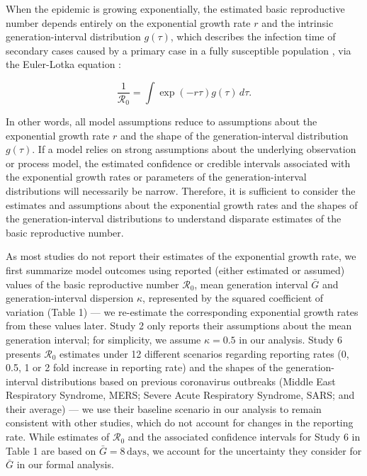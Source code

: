 \documentclass[12pt]{article}
\newcommand{\Ro}{\ensuremath{{\mathcal R}_{0}}\xspace}
\begin{document}
When the epidemic is growing exponentially, the estimated basic reproductive number depends entirely on the exponential growth rate $r$ and the intrinsic generation-interval distribution $g(\tau)$, which describes the infection time of secondary cases caused by a primary case in a fully susceptible population \citep{champredon2015intrinsic}, via the Euler-Lotka equation \citep{wallinga2007generation}:
\begin{linenomath*}
\begin{equation}
\frac{1}{\Ro} = \int \exp(-r\tau) g(\tau) \, d\tau.
\label{eq:euler}
\end{equation}
\end{linenomath*}
In other words, all model assumptions reduce to assumptions about the exponential growth rate $r$ and the shape of the generation-interval distribution $g(\tau)$.
If a model relies on strong assumptions about the underlying observation or process model, the estimated confidence or credible intervals associated with the exponential growth rates or parameters of the generation-interval distributions will necessarily be narrow.
Therefore, it is sufficient to consider the estimates and assumptions about the exponential growth rates and the shapes of the generation-interval distributions to understand disparate estimates of the basic reproductive number.

As most studies do not report their estimates of the exponential growth rate, we first summarize model outcomes using reported (either estimated or assumed) values of the basic reproductive number \Ro, mean generation interval $\bar G$ and generation-interval dispersion $\kappa$, represented by the squared coefficient of variation (Table 1) ---
we re-estimate the corresponding exponential growth rates from these values later.
Study 2 only reports their assumptions about the mean generation interval; for simplicity, we assume $\kappa = 0.5$ in our analysis.
Study 6 presents \Ro estimates under 12 different scenarios regarding reporting rates (0, 0.5, 1 or 2 fold increase in reporting rate) and the shapes of the generation-interval distributions based on previous coronavirus outbreaks (Middle East Respiratory Syndrome, MERS; Severe Acute Respiratory Syndrome, SARS; and their average) ---
we use their baseline scenario in our analysis to remain consistent with other studies, which do not account for changes in the reporting rate.
While estimates of \Ro and the associated confidence intervals for Study 6 in Table 1 are based on $\bar G = 8\,\mathrm{days}$, we account for the uncertainty they consider for $\bar G$ in our formal analysis.
\end{document}
